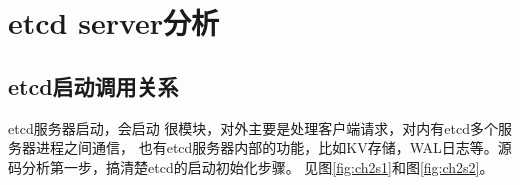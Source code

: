 
\mylineskip
\chapter{etcd server分析}
\section{etcd启动调用关系}
etcd服务器启动，会启动 很模块，对外主要是处理客户端请求，对内有etcd多个服务器进程之间通信，
也有etcd服务器内部的功能，比如KV存储，WAL日志等。源码分析第一步，搞清楚etcd的启动初始化步骤。
见图\ref{fig:ch2s1}和图\ref{fig:ch2s2}。
